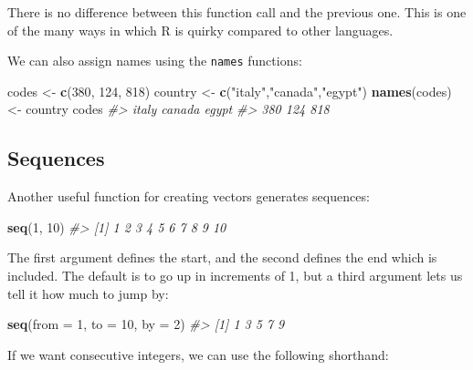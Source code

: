 \documentclass[
]{krantz}
\newenvironment{Shaded}{\begin{snugshade}}{\end{snugshade}}
\newcommand{\CommentTok}[1]{\textcolor[rgb]{0.37,0.37,0.37}{\textit{#1}}}
\newcommand{\DataTypeTok}[1]{\textcolor[rgb]{0.27,0.27,0.27}{#1}}
\newcommand{\DecValTok}[1]{\textcolor[rgb]{0.06,0.06,0.06}{#1}}
\newcommand{\KeywordTok}[1]{\textcolor[rgb]{0.27,0.27,0.27}{\textbf{#1}}}
\newcommand{\NormalTok}[1]{#1}
\newcommand{\StringTok}[1]{\textcolor[rgb]{0.5,0.5,0.5}{#1}}
\begin{document}
There is no difference between this function call and the previous one. This is one of the many ways in which R is quirky compared to other languages.

We can also assign names using the \texttt{names} functions:

\begin{Shaded}
\begin{Highlighting}[]
\NormalTok{codes <-}\StringTok{ }\KeywordTok{c}\NormalTok{(}\DecValTok{380}\NormalTok{, }\DecValTok{124}\NormalTok{, }\DecValTok{818}\NormalTok{)}
\NormalTok{country <-}\StringTok{ }\KeywordTok{c}\NormalTok{(}\StringTok{"italy"}\NormalTok{,}\StringTok{"canada"}\NormalTok{,}\StringTok{"egypt"}\NormalTok{)}
\KeywordTok{names}\NormalTok{(codes) <-}\StringTok{ }\NormalTok{country}
\NormalTok{codes}
\CommentTok{#>  italy canada  egypt }
\CommentTok{#>    380    124    818}
\end{Highlighting}
\end{Shaded}

\hypertarget{sequences}{%
\subsection{Sequences}\label{sequences}}

Another useful function for creating vectors generates sequences:

\begin{Shaded}
\begin{Highlighting}[]
\KeywordTok{seq}\NormalTok{(}\DecValTok{1}\NormalTok{, }\DecValTok{10}\NormalTok{)}
\CommentTok{#>  [1]  1  2  3  4  5  6  7  8  9 10}
\end{Highlighting}
\end{Shaded}

The first argument defines the start, and the second defines the end which is included. The default is to go up in increments of 1, but a third argument lets us tell it how much to jump by:

\begin{Shaded}
\begin{Highlighting}[]
\KeywordTok{seq}\NormalTok{(}\DataTypeTok{from =} \DecValTok{1}\NormalTok{, }\DataTypeTok{to =} \DecValTok{10}\NormalTok{, }\DataTypeTok{by =} \DecValTok{2}\NormalTok{)}
\CommentTok{#> [1] 1 3 5 7 9}
\end{Highlighting}
\end{Shaded}

If we want consecutive integers, we can use the following shorthand:
\end{document}
